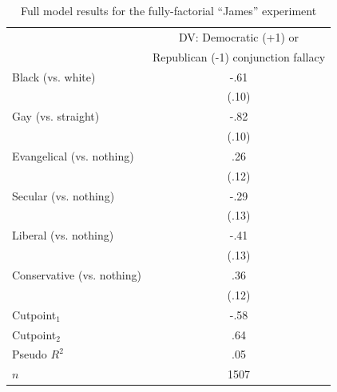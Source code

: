 \documentclass[12pt, letterpaper]{article}
\begin{document}
\begin{table}
\caption{Full model results for the fully-factorial ``James'' experiment}
\label{tab:logit_james}
\begin{center}
\begin{tabular}{l|c|}
\cline{2-2}
& DV: Democratic (+1) or \\
& Republican (-1) conjunction fallacy\\
\hline
\multicolumn{1}{|l|}{Black (vs. white)} & -.61\\
\multicolumn{1}{|l|}{} & (.10) \\
\multicolumn{1}{|l|}{Gay (vs. straight)}   & -.82\\
\multicolumn{1}{|l|}{} & (.10) \\
\multicolumn{1}{|l|}{Evangelical (vs. nothing)}     & .26\\
\multicolumn{1}{|l|}{} & (.12) \\
\multicolumn{1}{|l|}{Secular (vs. nothing)}         & -.29\\
\multicolumn{1}{|l|}{} & (.13) \\
\multicolumn{1}{|l|}{Liberal (vs. nothing)}         & -.41\\
\multicolumn{1}{|l|}{} & (.13) \\
\multicolumn{1}{|l|}{Conservative (vs. nothing)}    & .36\\
\multicolumn{1}{|l|}{} & (.12) \\
\hline
\multicolumn{1}{|l|}{Cutpoint$_{1}$}    & -.58\\
\multicolumn{1}{|l|}{Cutpoint$_{2}$}    & .64\\
\multicolumn{1}{|l|}{Pseudo $R^{2}$}    & .05\\
\multicolumn{1}{|l|}{$n$}    & 1507\\
\hline
\end{tabular}
\end{center}
\end{table}
\end{document}
